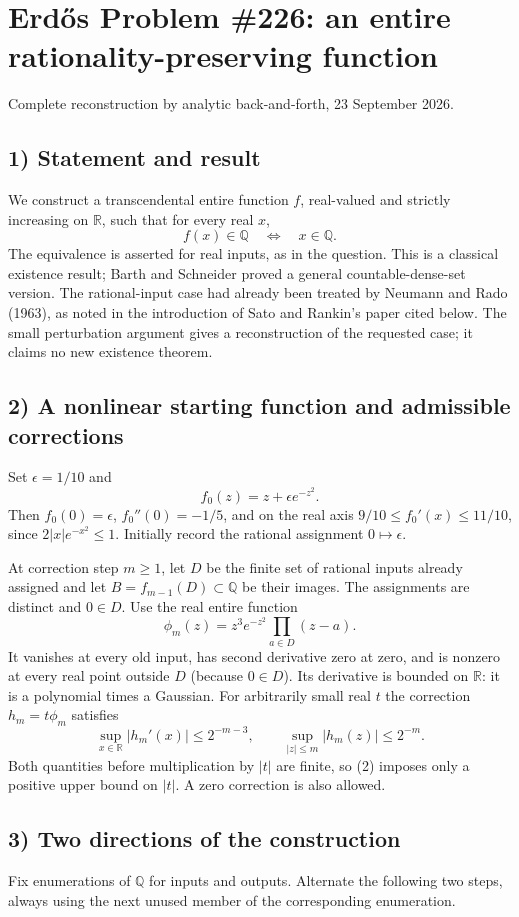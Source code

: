 \section{Erd\H{o}s Problem \#226: an entire rationality-preserving function}
\noindent Complete reconstruction by analytic back-and-forth, 23 September 2026.

\subsection*{1) Statement and result}
We construct a transcendental entire function $f$, real-valued and strictly increasing on $\mathbb R$, such that for every real $x$,
\[
 f(x)\in\mathbb Q\quad\Longleftrightarrow\quad x\in\mathbb Q.\tag{1}
\]
The equivalence is asserted for real inputs, as in the question. This is a classical existence result; Barth and Schneider proved a general countable-dense-set version. The rational-input case had already been treated by Neumann and Rado (1963), as noted in the introduction of Sato and Rankin's paper cited below. The small perturbation argument gives a reconstruction of the requested case; it claims no new existence theorem.

\subsection*{2) A nonlinear starting function and admissible corrections}
Set $\epsilon=1/10$ and
\[
 f_0(z)=z+\epsilon e^{-z^2}.
\]
Then $f_0(0)=\epsilon$, $f_0''(0)=-1/5$, and on the real axis $9/10\le f_0'(x)\le11/10$, since $2|x|e^{-x^2}\le1$. Initially record the rational assignment $0\mapsto\epsilon$.

At correction step $m\ge1$, let $D$ be the finite set of rational inputs already assigned and let $B=f_{m-1}(D)\subset\mathbb Q$ be their images. The assignments are distinct and $0\in D$. Use the real entire function
\[
 \phi_m(z)=z^3e^{-z^2}\prod_{a\in D}(z-a).
\]
It vanishes at every old input, has second derivative zero at zero, and is nonzero at every real point outside $D$ (because $0\in D$). Its derivative is bounded on $\mathbb R$: it is a polynomial times a Gaussian. For arbitrarily small real $t$ the correction $h_m=t\phi_m$ satisfies
\[
 \sup_{x\in\mathbb R}|h_m'(x)|\le2^{-m-3},
 \qquad \sup_{|z|\le m}|h_m(z)|\le2^{-m}.\tag{2}
\]
Both quantities before multiplication by $|t|$ are finite, so (2) imposes only a positive upper bound on $|t|$. A zero correction is also allowed.

\subsection*{3) Two directions of the construction}
Fix enumerations of $\mathbb Q$ for inputs and outputs. Alternate the following two steps, always using the next unused member of the corresponding enumeration.


